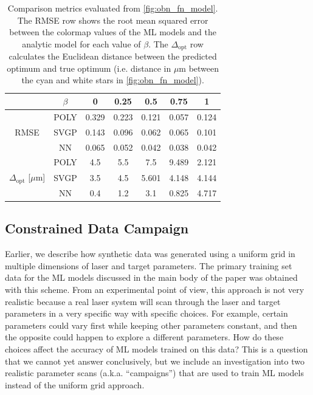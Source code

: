 \begin{table}
	\centering
	\begin{tabular}{|c||c|ccccc|}
		\hline
		&$\beta$   & 0        & 0.25     & 0.5      & 0.75     & 1        \\ 
		\hline
		& POLY & 0.329   & 0.223  & 0.121   & 0.057 & 0.124  \\
		RMSE & SVGP & 0.143  & 0.096 & 0.062 & 0.065 & 0.101  \\
		&NN   & 0.065 & 0.052 & 0.042 & 0.038 & 0.042 \\
		\hline 
		& POLY & 4.5 & 5.5  & 7.5     & 9.489  & 2.121 \\
		$\Delta_\text{opt}$ [$\mu$m] &SVGP & 3.5 & 4.5  & 5.601 & 4.148  & 4.144 \\
		&NN   & 0.4 & 1.2  & 3.1     & 0.825 & 4.717 \\
		\hline
	\end{tabular}
	\caption{Comparison metrics evaluated from \autoref{fig:obn_fn_model}. The RMSE row shows the root mean squared error between the colormap values of the ML models and the analytic model for each value of $\beta$. The $\Delta_\text{opt}$ row calculates the Euclidean distance between the predicted optimum and true optimum (i.e. distance in $\mu$m between the cyan and white stars in \autoref{fig:obn_fn_model}).}
	\label{tab:opt_results}
\end{table}
 
\subsection{Constrained Data Campaign}

Earlier, we describe how synthetic data was generated using a uniform grid in multiple dimensions of laser and target parameters. The primary training set data for the ML models discussed in the main body of the paper was obtained with this scheme. From an experimental point of view, this approach is not very realistic because a real laser system will scan through the laser and target parameters in a very specific way with specific choices. For example, certain parameters could vary first while keeping other parameters constant, and then the opposite could happen to explore a different parameters. How do these choices affect the accuracy of \gls{ML} models trained on this data? This is a question that we cannot yet answer conclusively, but we include an investigation into two realistic parameter scans (a.k.a. ``campaigns'') that are used to train \gls{ML} models instead of the uniform grid approach.

